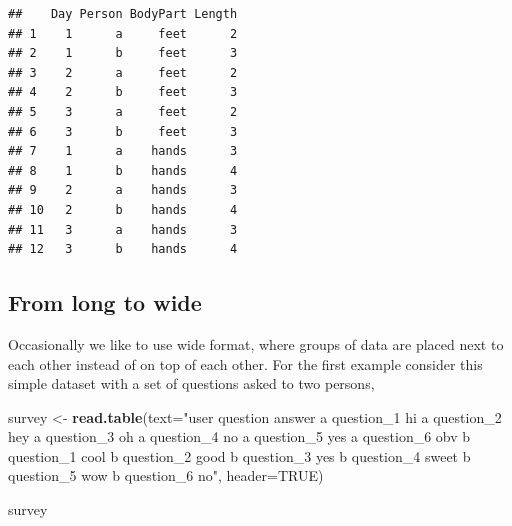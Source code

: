 \documentclass[]{book}
\newenvironment{Shaded}{\begin{snugshade}}{\end{snugshade}}
\newcommand{\CommentTok}[1]{\textcolor[rgb]{0.56,0.35,0.01}{\textit{#1}}}
\newcommand{\DataTypeTok}[1]{\textcolor[rgb]{0.13,0.29,0.53}{#1}}
\newcommand{\KeywordTok}[1]{\textcolor[rgb]{0.13,0.29,0.53}{\textbf{#1}}}
\newcommand{\NormalTok}[1]{#1}
\newcommand{\OperatorTok}[1]{\textcolor[rgb]{0.81,0.36,0.00}{\textbf{#1}}}
\newcommand{\OtherTok}[1]{\textcolor[rgb]{0.56,0.35,0.01}{#1}}
\newcommand{\StringTok}[1]{\textcolor[rgb]{0.31,0.60,0.02}{#1}}
\begin{document}
\begin{Shaded}
\end{Shaded}

\begin{verbatim}
##    Day Person BodyPart Length
## 1    1      a     feet      2
## 2    1      b     feet      3
## 3    2      a     feet      2
## 4    2      b     feet      3
## 5    3      a     feet      2
## 6    3      b     feet      3
## 7    1      a    hands      3
## 8    1      b    hands      4
## 9    2      a    hands      3
## 10   2      b    hands      4
## 11   3      a    hands      3
## 12   3      b    hands      4
\end{verbatim}

\hypertarget{from-long-to-wide}{%
\subsection{From long to wide}\label{from-long-to-wide}}

Occasionally we like to use wide format, where groups of data are placed next to each other instead of on top of each other. For the first example consider this simple dataset with a set of questions asked to two persons,

\begin{Shaded}
\begin{Highlighting}[]
\NormalTok{survey <-}\StringTok{ }\KeywordTok{read.table}\NormalTok{(}\DataTypeTok{text=}\StringTok{"user question    answer}
\StringTok{a   question_1  hi}
\StringTok{a   question_2  hey}
\StringTok{a   question_3  oh}
\StringTok{a   question_4  no}
\StringTok{a   question_5  yes}
\StringTok{a   question_6  obv}
\StringTok{b   question_1  cool}
\StringTok{b   question_2  good}
\StringTok{b   question_3  yes}
\StringTok{b   question_4  sweet}
\StringTok{b   question_5  wow}
\StringTok{b   question_6  no"}\NormalTok{, }\DataTypeTok{header=}\OtherTok{TRUE}\NormalTok{)}

\NormalTok{survey}
\end{Highlighting}
\end{Shaded}
\end{document}
